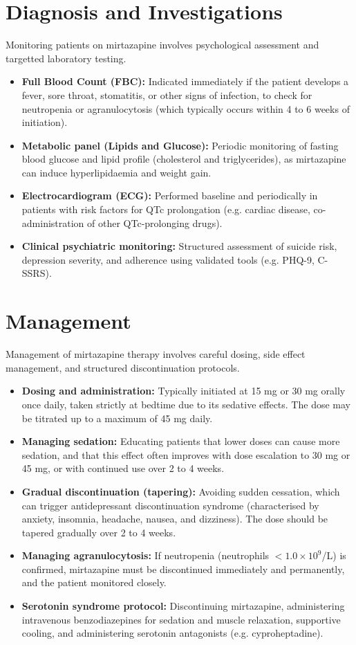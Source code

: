 \section*{Diagnosis and Investigations}
Monitoring patients on mirtazapine involves psychological assessment and targetted laboratory testing.
\begin{itemize}
    \item \textbf{Full Blood Count (FBC):} Indicated immediately if the patient develops a fever, sore throat, stomatitis, or other signs of infection, to check for neutropenia or agranulocytosis (which typically occurs within 4 to 6 weeks of initiation).
    \item \textbf{Metabolic panel (Lipids and Glucose):} Periodic monitoring of fasting blood glucose and lipid profile (cholesterol and triglycerides), as mirtazapine can induce hyperlipidaemia and weight gain.
    \item \textbf{Electrocardiogram (ECG):} Performed baseline and periodically in patients with risk factors for QTc prolongation (e.g. cardiac disease, co-administration of other QTc-prolonging drugs).
    \item \textbf{Clinical psychiatric monitoring:} Structured assessment of suicide risk, depression severity, and adherence using validated tools (e.g. PHQ-9, C-SSRS).
\end{itemize}

\section*{Management}
Management of mirtazapine therapy involves careful dosing, side effect management, and structured discontinuation protocols.
\begin{itemize}
    \item \textbf{Dosing and administration:} Typically initiated at 15 mg or 30 mg orally once daily, taken strictly at bedtime due to its sedative effects. The dose may be titrated up to a maximum of 45 mg daily.
    \item \textbf{Managing sedation:} Educating patients that lower doses can cause more sedation, and that this effect often improves with dose escalation to 30 mg or 45 mg, or with continued use over 2 to 4 weeks.
    \item \textbf{Gradual discontinuation (tapering):} Avoiding sudden cessation, which can trigger antidepressant discontinuation syndrome (characterised by anxiety, insomnia, headache, nausea, and dizziness). The dose should be tapered gradually over 2 to 4 weeks.
    \item \textbf{Managing agranulocytosis:} If neutropenia (neutrophils $<1.0 \times 10^9$/L) is confirmed, mirtazapine must be discontinued immediately and permanently, and the patient monitored closely.
    \item \textbf{Serotonin syndrome protocol:} Discontinuing mirtazapine, administering intravenous benzodiazepines for sedation and muscle relaxation, supportive cooling, and administering serotonin antagonists (e.g. cyproheptadine).
\end{itemize}

